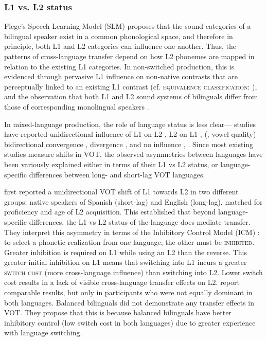 \documentclass[12 pt]{article}
\begin{document}
\subsubsection*{L1 vs. L2 status} 
Flege's Speech Learning Model (SLM) \citeyearpar{flege1995second,flege2007language} proposes that the sound categories of a bilingual speaker exist in a common phonological space, and therefore in principle, both L1 and L2 categories can influence one another. Thus, the patterns of cross-language transfer depend on how L2 phonemes are mapped in relation to the existing L1 categories. In non-switched production, this is evidenced through pervasive L1 influence on non-native contrasts that are perceptually linked to an existing L1 contrast (cf. \textsc{equivalence classification}: \cite{flege1984limits,flege1987production}), and the observation that both L1 and L2 sound systems of bilinguals differ from those of corresponding monolingual speakers \citep[e.g.][vowel quality]{guion2003vowel}. 

In mixed-language production, the role of language status is less clear--- studies have reported unidirectional influence of L1 on L2 \citep[][VOT]{balukas2015spanish,antoniou2011inter,vsimavckova2015immediate,goldrick2014language}, L2 on L1 \citep[][VOT]{tsui2019impact, olson2013bilingual}, (\cite{elias2017effects}, vowel quality) bidirectional convergence \citep[][VOT]{bullock2009trying, olson2016role}, divergence \citep[][VOT]{bullock2009trying,vsimavckova2018patterns}, and no influence \citep[][vowel quality]{muldner2019phonetics}, \citep[][phonological process]{schwartz2015language}. Since most existing studies measure shifts in VOT, the observed asymmetries between languages have been variously explained either in terms of their L1 vs L2 status, or language-specific differences between long- and short-lag VOT languages. %

\cite{olson2013bilingual} first reported a unidirectional VOT shift of L1 towards L2 in two different groups: native speakers of Spanish (short-lag) and English (long-lag), matched for proficiency and age of L2 acquisition. This established that beyond language-specific differences, the L1 vs L2 status of the language does mediate transfer. They interpret this asymmetry in terms of the Inhibitory Control Model (ICM) \citep{green1998mental}: to select a phonetic realization from one language, the other must be \textsc{inhibited}. Greater inhibition is required on L1 while using an L2 than the reverse. This greater initial inhibition on L1 means that switching into L1 incurs a greater \textsc{switch cost} (more cross-language influence) than switching into L2. Lower switch cost results in a lack of visible cross-language transfer effects on L2. \cite{tsui2019impact} report comparable results, but only in participants who were not equally dominant in both languages. Balanced bilinguals did not demonstrate any transfer effects in VOT. They propose that this is because balanced bilinguals have better inhibitory control (low switch cost in both languages) due to greater experience with language switching.
\end{document}
